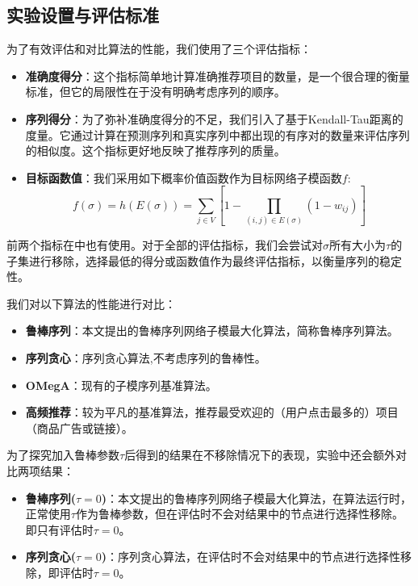 \subsection{实验设置与评估标准}

为了有效评估和对比算法的性能，我们使用了三个评估指标：

\begin{itemize}
    \item \textbf{准确度得分}：这个指标简单地计算准确推荐项目的数量，是一个很合理的衡量标准，但它的局限性在于没有明确考虑序列的顺序。
    \item \textbf{序列得分}：为了弥补准确度得分的不足，我们引入了基于Kendall-Tau距离\cite{kendall1938new}的度量。它通过计算在预测序列和真实序列中都出现的有序对的数量来评估序列的相似度。这个指标更好地反映了推荐序列的质量。
    \item \textbf{目标函数值}：我们采用如下概率价值函数作为目标网络子模函数$f$:
\begin{equation}
    f(\sigma)=h(E(\sigma))=\sum_{j\in V} [1- \prod_{(i,j)\in E(\sigma)} (1-w_{ij})]
\end{equation}
\end{itemize}

前两个指标在\parencite{mitrovic2019adaptive}中也有使用。对于全部的评估指标，我们会尝试对$\sigma$所有大小为$\tau$的子集进行移除，选择最低的得分或函数值作为最终评估指标，以衡量序列的稳定性。

我们对以下算法的性能进行对比：

\begin{itemize}
\item {\bfseries 鲁棒序列}：本文提出的鲁棒序列网络子模最大化算法，简称鲁棒序列算法。
\item {\bfseries 序列贪心}：序列贪心算法\cite{mitrovic2018submodularity},不考虑序列的鲁棒性。
\item {\bfseries OMegA}：现有的子模序列基准算法\cite{tschiatschek2017selecting}。
\item {\bfseries 高频推荐}：较为平凡的基准算法，推荐最受欢迎的（用户点击最多的）项目（商品广告或链接）。
\end{itemize}

为了探究加入鲁棒参数$\tau$后得到的结果在不移除情况下的表现，实验中还会额外对比两项结果：
\begin{itemize}
\item {\bfseries 鲁棒序列($\tau = 0$)}：本文提出的鲁棒序列网络子模最大化算法，在算法运行时，正常使用$\tau$作为鲁棒参数，但在评估时不会对结果中的节点进行选择性移除。即只有评估时$\tau = 0$。
\item {\bfseries 序列贪心($\tau = 0$)}：序列贪心算法，在评估时不会对结果中的节点进行选择性移除，即评估时$\tau = 0$。
\end{itemize}



